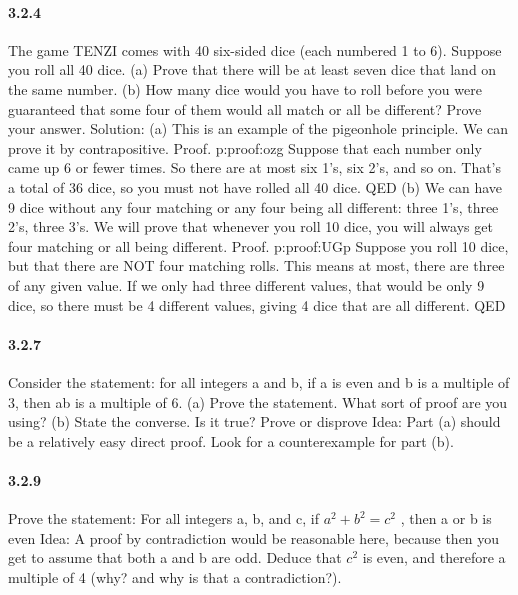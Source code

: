 \documentclass{article}
\begin{document}
\paragraph{3.2.4}
The game TENZI comes with 40 six-sided dice (each numbered 1 to 6).\newline
Suppose you roll all 40 dice.\newline
(a) Prove that there will be at least seven dice that land on the same
number.\newline
(b) How many dice would you have to roll before you were guaranteed that some four of them would all match or all be different?
Prove your answer.\newline
Solution:\newline
(a) This is an example of the pigeonhole principle. We can prove it by
contrapositive.\newline
Proof. p:proof:ozg Suppose that each number only came up 6 or
fewer times. So there are at most six 1’s, six 2’s, and so on. That’s a
total of 36 dice, so you must not have rolled all 40 dice. QED\newline
(b) We can have 9 dice without any four matching or any four being all
different: three 1’s, three 2’s, three 3’s. We will prove that whenever
you roll 10 dice, you will always get four matching or all being
different.\newline
Proof. p:proof:UGp Suppose you roll 10 dice, but that there are NOT
four matching rolls. This means at most, there are three of any given
value. If we only had three different values, that would be only 9
dice, so there must be 4 different values, giving 4 dice that are all
different. QED
\paragraph{3.2.7}
Consider the statement: for all integers a and b, if a is even and b is a
multiple of 3, then ab is a multiple of 6.\newline
(a) Prove the statement. What sort of proof are you using?\newline
(b) State the converse. Is it true? Prove or disprove\newline
Idea:\newline
Part (a) should be a relatively easy direct proof. \newline
Look for a counterexample for part (b).
\paragraph{3.2.9}
Prove the statement: For all integers a, b, and c, if $a^2+b^2=c^2$ , then a or b is even\newline
Idea:\newline
A proof by contradiction would be reasonable here, because then
you get to assume that both a and b are odd. Deduce that $c^2$ is even, and therefore a multiple of 4 (why? and why is that a contradiction?).
\end{document}
